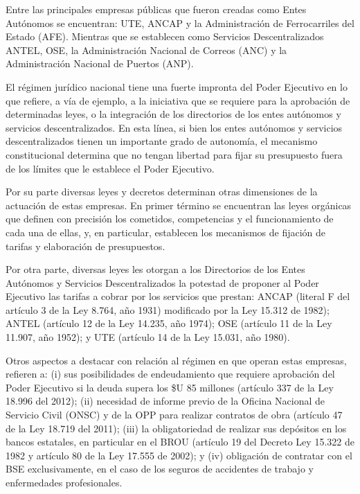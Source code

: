 \documentclass[
  12pt,
  spanish,
]{book}
\begin{document}
Entre las principales empresas públicas que fueron creadas como Entes Autónomos se encuentran: UTE, ANCAP y la Administración de Ferrocarriles del Estado (AFE). Mientras que se establecen como Servicios Descentralizados ANTEL, OSE, la Administración Nacional de Correos (ANC) y la Administración Nacional de Puertos (ANP).

El régimen jurídico nacional tiene una fuerte impronta del Poder Ejecutivo \citep{Bergara2005} en lo que refiere, a vía de ejemplo, a la iniciativa que se requiere para la aprobación de determinadas leyes, o la integración de los directorios de los entes autónomos y servicios descentralizados. En esta línea, si bien los entes autónomos y servicios descentralizados tienen un importante grado de autonomía, el mecanismo constitucional determina que no tengan libertad para fijar su presupuesto fuera de los límites que le establece el Poder Ejecutivo.

Por su parte diversas leyes y decretos determinan otras dimensiones de la actuación de estas empresas. En primer término se encuentran las leyes orgánicas que definen con precisión los cometidos, competencias y el funcionamiento de cada una de ellas, y, en particular, establecen los mecanismos de fijación de tarifas y elaboración de presupuestos.

Por otra parte, diversas leyes les otorgan a los Directorios de los Entes Autónomos y Servicios Descentralizados la potestad de proponer al Poder Ejecutivo las tarifas a cobrar por los servicios que prestan: ANCAP (literal F del artículo 3 de la Ley 8.764, año 1931) modificado por la Ley 15.312 de 1982); ANTEL (artículo 12 de la Ley 14.235, año 1974); OSE (artículo 11 de la Ley 11.907, año 1952); y UTE (artículo 14 de la Ley 15.031, año 1980).

Otros aspectos a destacar con relación al régimen en que operan estas empresas, refieren a: (i) sus posibilidades de endeudamiento que requiere aprobación del Poder Ejecutivo si la deuda supera los \$U 85 millones (artículo 337 de la Ley 18.996 del 2012); (ii) necesidad de informe previo de la Oficina Nacional de Servicio Civil (ONSC) y de la OPP para realizar contratos de obra (artículo 47 de la Ley 18.719 del 2011); (iii) la obligatoriedad de realizar sus depósitos en los bancos estatales, en particular en el BROU (artículo 19 del Decreto Ley 15.322 de 1982 y artículo 80 de la Ley 17.555 de 2002); y (iv) obligación de contratar con el BSE exclusivamente, en el caso de los seguros de accidentes de trabajo y enfermedades profesionales.
\end{document}
